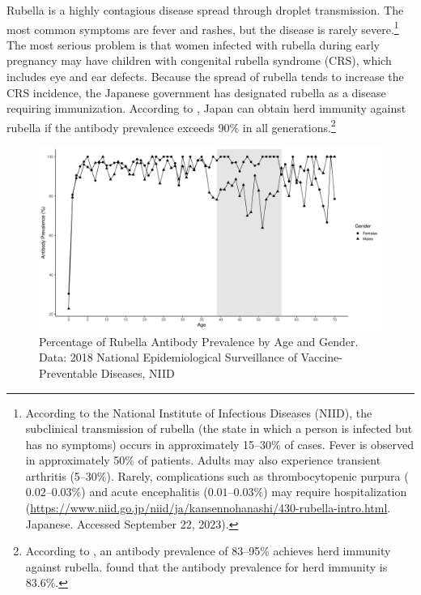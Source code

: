 \documentclass[
  11pt,
  a4paper
]{article}
\begin{document}
Rubella is a highly contagious disease spread through droplet transmission. The most common symptoms are fever and rashes, but the disease is rarely severe.\footnote{According to the National Institute of Infectious Diseases (NIID), the subclinical transmission of rubella (the state in which a person is infected but has no symptoms) occurs in approximately 15--30\% of cases. Fever is observed in approximately 50\% of patients. Adults may also experience transient arthritis (5--30\%). Rarely, complications such as thrombocytopenic purpura (\(0.02\)--\(0.03\)\%) and acute encephalitis (\(0.01\)--\(0.03\)\%) may require hospitalization (\url{https://www.niid.go.jp/niid/ja/kansennohanashi/430-rubella-intro.html}. Japanese. Accessed September 22, 2023).} The most serious problem is that women infected with rubella during early pregnancy may have children with congenital rubella syndrome (CRS), which includes eye and ear defects. Because the spread of rubella tends to increase the CRS incidence, the Japanese government has designated rubella as a disease requiring immunization. According to \citet{Kinoshita2016}, Japan can obtain herd immunity against rubella if the antibody prevalence exceeds 90\% in all generations.\footnote{According to \citet{Plans-Rubio2012}, an antibody prevalence of 83--95\% achieves herd immunity against rubella. \citet{Nishiura2015} found that the antibody prevalence for herd immunity is 83.6\%.}

\begin{figure}[t]
\includegraphics{Main-Document-LaTeX_files/figure-latex/antibody-1} \caption{Percentage of Rubella Antibody Prevalence by Age and Gender. Data: 2018 National Epidemiological Surveillance of Vaccine-Preventable Diseases, NIID}\label{fig:antibody}
\end{figure}
\end{document}
